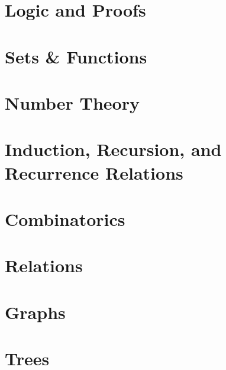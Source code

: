 \documentclass{package/notes}
\begin{document}
\chapter{Logic and Proofs}



\chapter{Sets \& Functions}


\chapter{Number Theory}


\chapter{Induction, Recursion, and Recurrence Relations}


\chapter{Combinatorics}


\chapter{Relations}


\chapter{Graphs}


\chapter{Trees}

\end{document}
